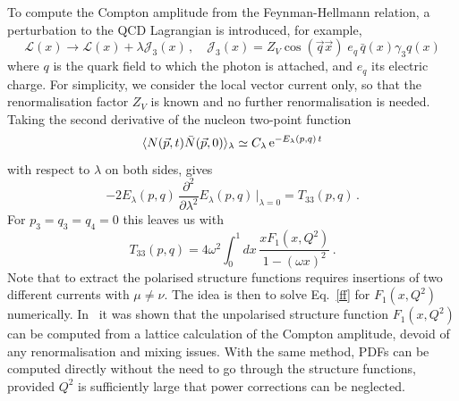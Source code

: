 To compute the Compton amplitude from the Feynman-Hellmann relation, a perturbation to the QCD Lagrangian is introduced, for example,
\begin{equation}
\mathcal{L}(x) \rightarrow \mathcal{L}(x) + \lambda \mathcal{J}_3(x)\,, \quad \mathcal{J}_3(x)=Z_V\cos(\vec{q}\vec{x})\; e_q \,\bar{q}(x)\gamma_3 q(x) 
\label{in}
\end{equation}
where $q$ is the quark field to which the photon is attached, and $e_q$ its electric charge. For simplicity, we consider the local vector current only, so that the renormalisation factor $Z_V$ is known and no further renormalisation is needed. Taking the second derivative of the nucleon two-point function 
\begin{equation}
\langle N(\vec{p},t) \bar{N}(\vec{p},0)\rangle_\lambda \simeq C_\lambda\, {\rm e}^{-E_\lambda(p,q)\,t}
\end{equation}
with respect to $\lambda$ on both sides, gives
\begin{equation}
-2 E_\lambda(p,q)\, \frac{\partial^2}{\partial\lambda^2}  E_\lambda(p,q)\,\big|_{\lambda=0} = T_{33}(p,q) \,.
\end{equation}
For $p_3=q_3=q_4=0$ this leaves us with
\begin{equation}
T_{33}(p,q) = 4 \omega^2 \int_0^1 dx\,  \frac{xF_1(x,Q^2)}{1-(\omega x)^2} \,.
\label{ff}
\end{equation}
Note that to extract the polarised structure functions requires insertions of two different currents with $\mu\neq \nu$. The idea is then to solve Eq.~\eqref{ff} for $F_1(x,Q^2)$ numerically.
%
In~\cite{Ji:2001wha,Chambers:2017dov} it was shown that the unpolarised 
structure function $F_1(x,Q^2)$ can be computed from a lattice calculation 
of the Compton amplitude, devoid of any renormalisation and mixing issues. 
With the same method, PDFs can be computed directly without the need to go 
through the structure functions, provided $Q^2$ is sufficiently large that 
power corrections can be neglected. 


